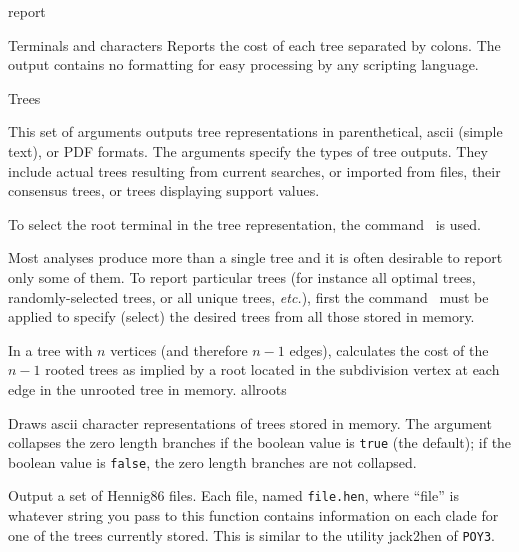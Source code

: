 \begin{command}{report}{}
\begin{arguments}
\begin{argumentgroup}{Terminals and characters}
                {Reports the cost of each tree separated by colons. The output
                contains no formatting for easy processing by any scripting
                language.}
                {}

		\end{argumentgroup}

		\begin{argumentgroup}{Trees}
            {This set of arguments outputs tree representations
            in parenthetical, ascii (simple text), or PDF formats.
            The arguments specify the types of tree outputs. They include
            actual trees resulting from current searches, or imported from
            files, their consensus trees, or trees displaying support values.
            
            To select the root terminal in the tree representation, the command~ is used.
            
            Most analyses produce more than a single tree and it is
            often desirable to report only some of them. To
            report particular trees (for instance all optimal trees,
            randomly-selected trees, or all unique trees, \emph{etc.}), first the
            command~ must be applied to specify (select)
             the desired trees from all those stored in memory.} 

                {In a tree with $n$ vertices (and therefore $n - 1$ edges),
                calculates the cost of the $n - 1$ rooted trees as implied by a
                root located in the subdivision vertex at each edge in the unrooted
                tree in memory.}
                {allroots}

                {Draws ascii character representations of trees stored in memory. The
                argument  collapses the zero length branches if
                the boolean value is \texttt{true} (the default); if the boolean value is
                \texttt{false}, the zero length branches are not collapsed.}
				{}

	     {Output a set of Hennig86 files. Each file, named \texttt{file.hen},
                where ``file'' is whatever string you pass to this function
                contains information on each clade for one of the trees
                currently stored. This is similar to the utility jack2hen 
                of \texttt{POY3}.}
				{}


\end{argumentgroup}
\end{arguments}
\end{command}
